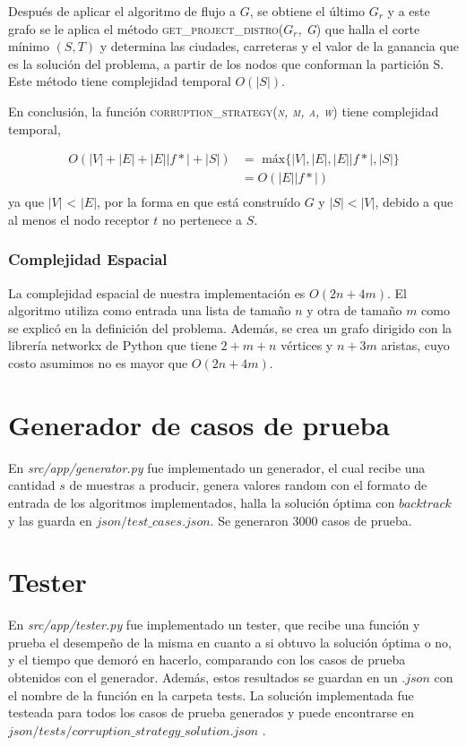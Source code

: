\documentclass[10pt]{article} %
\begin{document}
	Despu\'es de aplicar el algoritmo de flujo a $G$, se obtiene el \'ultimo $G_r$ y a este grafo se le aplica el m\'etodo \textsc{get\_project\_distro(\textit{$G_r$, G})} que halla el corte m\'inimo $(S,T)$ y determina las ciudades, carreteras y el valor de la ganancia que es la soluci\'on del problema, a partir de los nodos que conforman la partici\'on S. Este m\'etodo tiene complejidad temporal $O(|S|)$.
	
	En conclusi\'on, la funci\'on \textsc{corruption\_strategy(\textit{n, m, a, w})} tiene complejidad temporal,
	
	\begin{equation}
		\begin{aligned}
			O(|V| + |E| + |E||f*| + |S|) &=\text{ m\'ax}\{|V|, |E|, |E||f*|, |S|\}\\
			&=O(|E||f*|)\\
		\end{aligned}		
	\end{equation}
	ya que $|V|$ < $|E|$, por la forma en que est\'a constru\'ido $G$ y $|S|<|V|$, debido a que al menos el nodo receptor $t$ no pertenece a $S$.

	

	\subsubsection{Complejidad Espacial}
	
	La complejidad espacial de nuestra implementaci\'on es $O(2n + 4m)$. El algoritmo utiliza como entrada una lista de tama\~no $n$ y otra de tama\~no $m$ como se explic\'o en la definici\'on del problema. Adem\'as, se crea un grafo dirigido con la librer\'ia networkx de Python que tiene $2 + m + n$ v\'ertices y $n + 3m$ aristas, cuyo costo asumimos no es mayor que $O(2n + 4m)$.
		
	\section{Generador de casos de prueba}
	
	En \textit{src/app/generator.py} fue implementado un generador, el cual recibe una cantidad $ s $ de muestras a producir, genera valores random con el formato de entrada de los algoritmos implementados, halla la soluci\'on \'optima con $ backtrack $ y las guarda en $ json/test\_cases.json $. Se generaron 3000 casos de prueba.
	
	\section{Tester}
	En \textit{src/app/tester.py} fue implementado un tester, que recibe una funci\'on y prueba el desempe\~no de la misma en cuanto a si obtuvo la soluci\'on \'optima o no, y el tiempo que demor\'o en hacerlo, comparando con los casos de prueba obtenidos con el generador. Adem\'as, estos resultados se guardan en un $ .json $ con el nombre de la funci\'on en la carpeta tests. La soluci\'on implementada fue testeada para todos los casos de prueba generados y puede encontrarse en $ json/tests/corruption\_strategy\_solution.json $ .
	
\end{document}
